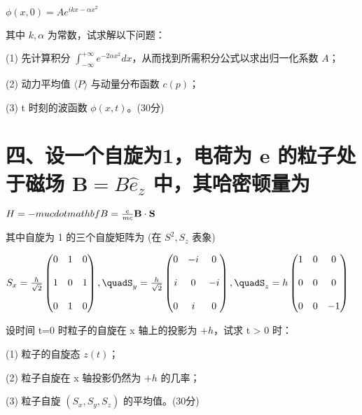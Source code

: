 $\phi(x,0) = Ae^{ikx - \alpha x^2}$

其中 $k, \alpha$ 为常数，试求解以下问题：

(1) 先计算积分 $\int_{-\infty}^{+\infty} e^{-2 \alpha x^2} dx$，从而找到所需积分公式以求出归一化系数 $A$；

(2) 动力平均值 $\langle P \rangle$ 与动量分布函数 $c(p)$；

(3) t 时刻的波函数 $\phi(x,t)$。(30分)

\section*{四、设一个自旋为1，电荷为 e 的粒子处于磁场 $\mathbf{B} = B \hat{e}_z$ 中，其哈密顿量为}
$H = -\\mu \\cdot \\mathbf{B} = \frac{e}{mc} \mathbf{B} \cdot \mathbf{S}$

其中自旋为 1 的三个自旋矩阵为 (在 $S^2, S_z$ 表象)

$S_x = \frac{h}{\sqrt{2}}\begin{pmatrix}0 & 1 & 0 \\\\1 & 0 & 1 \\\\0 & 1 & 0 \end{pmatrix}, \quadS_y = \frac{h}{\sqrt{2}}\begin{pmatrix}0 & -i & 0 \\\\i & 0 & -i \\\\0 & i & 0 \end{pmatrix}, \quadS_z = h\begin{pmatrix}1 & 0 & 0 \\\\0 & 0 & 0 \\\\0 & 0 & -1 \end{pmatrix}$

设时间 t=0 时粒子的自旋在 x 轴上的投影为 $+h$，试求 t > 0 时：

(1) 粒子的自旋态 $z(t)$；

(2) 粒子自旋在 x 轴投影仍然为 $+h$ 的几率；

(3) 粒子自旋 $(S_x, S_y, S_z)$ 的平均值。(30分)
